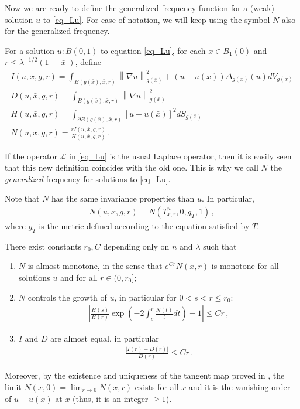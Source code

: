 \documentclass[11pt]{article}
\begin{document}
Now we are ready to define the generalized frequency function for a (weak) solution 
$u$ to \eqref{eq_Lu}. For ease of notation, we will keep using the symbol $N$ also for the generalized frequency.
\begin{definition}\label{deph_LN}
For a solution $u:B(0,1)$ to equation \eqref{eq_Lu}, for each $\bar x\in B_1(0)$ and
 $r\leq \lambda^{-1/2}(1-{\left|{\bar x}\right|})$, define
\begin{gather}
 I(u,\bar x,g,r)=\int_{B(g(\bar x),\bar x,r)}{\left\|{\nabla u}\right\|}_{g(\bar x)}^2
+ (u-u(\bar x))\Delta_{g(\bar x)} (u )dV_{g(\bar x)}\\
 D(u,\bar x,g,r)=\int_{B(g(\bar x),\bar x,r)}{\left\|{\nabla u}\right\|}_{g(\bar x)}^2\\
H(u,\bar x,g,r)=\int_{\partial B(g(\bar x) ,\bar x,r)} 
{\left[{u-u(\bar x)}\right]}^2 dS_{g(\bar x)}\\
N(u,\bar x,g,r) =\frac{rI(u,\bar x,g,r)}{H(u,\bar x,g,r)}\, .
\end{gather}
\end{definition}
\begin{remark}
If the operator ${\mathcal{L}}$ in \eqref{eq_Lu} is the usual Laplace operator, then it is easily seen that this new definition coincides with the old one. This is why we call $N$ the \textit{generalized} frequency for solutions to \eqref{eq_Lu}.
\end{remark}
Note that $N$ has the same invariance properties than $u$. In particular,
\begin{gather}
 N(u,x,g,r) = N(T^u_{x,r},0,g_T,1)\, ,
\end{gather}
where $g_T$ is the metric defined according to the equation satisfied by $T$.

\begin{proposition}\label{prop_genfreq}
 There exist constants $r_0,C$ depending only on $n$ and $\lambda$ such that
 \begin{enumerate}
  \item $N$ is almost monotone, in the sense that $e^{Cr} N(x,r)$ is monotone for all solutions $u$ and for all $r\in (0,r_0]$;
  \item $N$ controls the growth of $u$, in particular for $0<s<r \leq r_0$:
  \begin{gather}
   {\left|{\frac{H(s)}{H(r)} \exp{\left({-2\int_s^r \frac{N(t)}{t} dt}\right)} -1}\right|} \leq C r\, ,
  \end{gather}
  \item $I$ and $D$ are almost equal, in particular
  \begin{gather}
   \frac{{\left|{I(r)-D(r)}\right|}}{D(r)} \leq C r\, .
  \end{gather}

 \end{enumerate}
\end{proposition}
Moreover, by the existence and uniqueness of the tangent map proved in \cite{han_sing}, the limit $N(x,0)=\lim_{r\to 0} N(x,r)$ exists for all $x$ and it is the vanishing order of $u-u(x)$ at $x$ (thus, it is an integer $\geq 1$).
\end{document}
